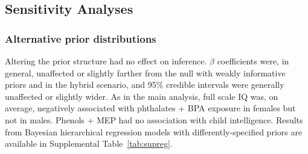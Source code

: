 \subsection{Sensitivity Analyses}
\subsubsection{Alternative prior distributions}
Altering the prior structure had no effect on inference. $\beta$ coefficients were, in general, unaffected or slightly farther from the null with weakly informative priors and in the hybrid scenario, and 95\% credible intervals were generally unaffected or slightly wider. As in the main analysis, full scale IQ was, on average, negatively associated with phthalates + BPA exposure in females but not in males. Phenols + MEP had no association with child intelligence. Results from Bayesian hierarchical regression models with differently-specified priors are available in Supplemental Table~\ref{tab:supreg}.

